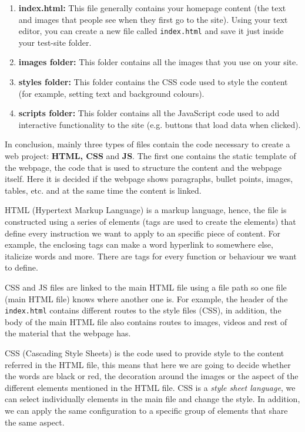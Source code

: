 \begin{enumerate}[nosep]
    \item \textbf{index.html:} This file generally contains your homepage content (the text and images that people see when they first go to the site). Using your text editor, you can create a new file called \texttt{index.html} and save it just inside your test-site folder.
    \item \textbf{images folder:} This folder contains all the images that you use on your site.
    \item \textbf{styles folder:} This folder contains the CSS code used to style the content (for example, setting text and background colours).
    \item \textbf{scripts folder:} This folder contains all the JavaScript code used to add interactive functionality to the site (e.g. buttons that load data when clicked).    
\end{enumerate}

In conclusion, mainly three types of files contain the code necessary to create a web project: \textbf{HTML, CSS} and \textbf{JS}. The first one contains the static template of the webpage, the code that is used to structure the content and the webpage itself. Here it is decided if the webpage shows paragraphs, bullet points, images, tables, etc. and at the same time the content is linked. 

HTML (Hypertext Markup Language) is a markup language, hence, the file is constructed using a series of elements (tags are used to create the elements) that define every instruction we want to apply to an specific piece of content. For example, the enclosing tags can make a word hyperlink to somewhere else, italicize words and more. There are tags for every function or behaviour we want to define.

CSS and JS files are linked to the main HTML file using a file path so one file (main HTML file) knows where another one is. For example, the header of the \texttt{index.html} contains different routes to the style files (CSS), in addition, the body of the main HTML file also contains routes to images, videos and rest of the material that the webpage has. 

CSS (Cascading Style Sheets) is the code used to provide style to the content referred in the HTML file, this means that here we are going to decide whether the words are black or red, the decoration around the images or the aspect of the different elements mentioned in the HTML file. CSS is a \textit{style sheet language}, we can select individually elements in the main file and change the style. In addition, we can apply the same configuration to a specific group of elements that share the same aspect. 


